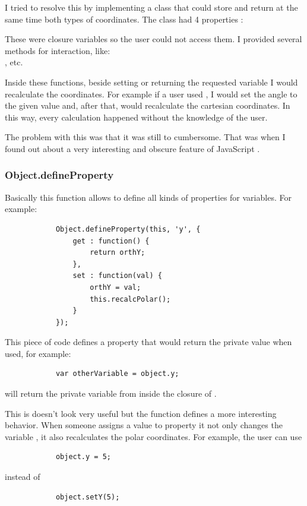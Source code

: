         I tried to resolve this by implementing a class that could store and return at the same time both types of coordinates.
        The class had 4 properties : \\

        These were closure \cite{closures} variables so the user could not access them.
        I provided several methods for interaction, like: \\
        , etc.


        Inside these functions, beside setting or returning the requested variable I would recalculate the coordinates.
        For example if a user used , I would set the angle to the given value and, after that, would recalculate the cartesian coordinates.
        In this way, every calculation happened without the knowledge of the user.


        The problem with this was that it was still to cumbersome.
        That was when I found out about a very interesting and obscure feature of JavaScript \cite{defineProperty}.

        \subsubsection{Object.defineProperty}

            Basically this function allows to define all kinds of properties for variables. For example:
            \begin{lstlisting}
            Object.defineProperty(this, 'y', {
                get : function() {
                    return orthY;
                },
                set : function(val) {
                    orthY = val;
                    this.recalcPolar();
                }
            });
            \end{lstlisting}

            This piece of code defines a property  that would return the private value  when used, for example:
            \begin{lstlisting}
            var otherVariable = object.y;
            \end{lstlisting}
            will return the private variable  from inside the closure of .

            This is doesn't look very useful but the  function defines a more interesting behavior. When someone assigns a value to property  it not only changes the variable , it also recalculates the polar coordinates. For example, the user can use \\
            \begin{lstlisting}
            object.y = 5;
            \end{lstlisting}
            instead of
            \begin{lstlisting}
            object.setY(5);
            \end{lstlisting}

